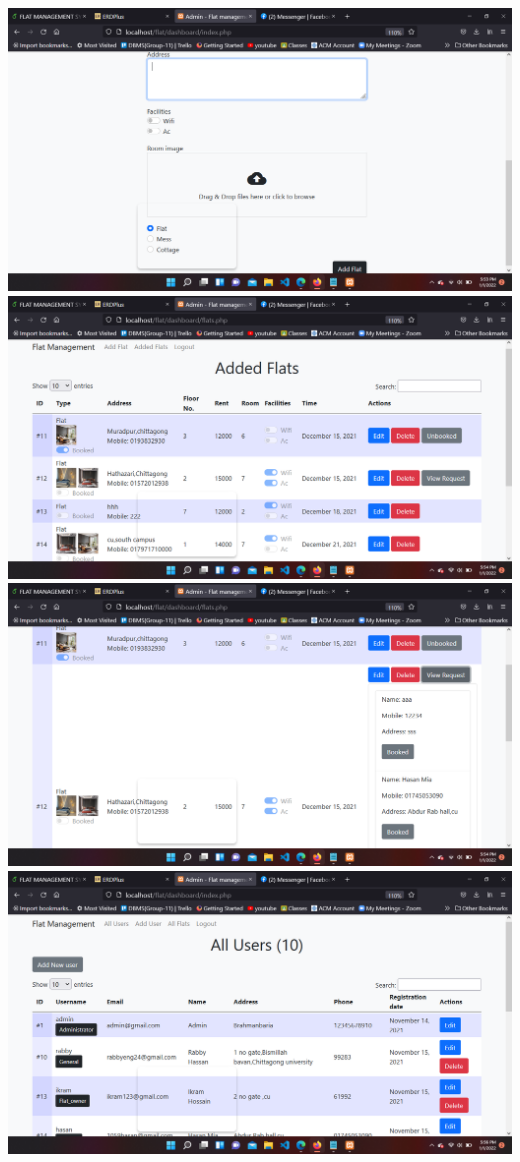 \includegraphics[width=1\textwidth, inner]{images/flat4.png}\\
\includegraphics[width=1\textwidth, inner]{images/flat5.png}\\
\includegraphics[width=1\textwidth, inner]{images/flat6.png}\\
\includegraphics[width=1\textwidth, inner]{images/flat7.png}\\

